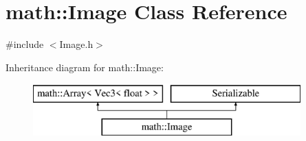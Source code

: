 \hypertarget{classmath_1_1_image}{}\section{math\+:\+:Image Class Reference}
\label{classmath_1_1_image}


{\ttfamily \#include $<$Image.\+h$>$}

Inheritance diagram for math\+:\+:Image\+:\begin{figure}[H]
\begin{center}
\leavevmode
\includegraphics[height=2.000000cm]{classmath_1_1_image}
\end{center}
\end{figure}

